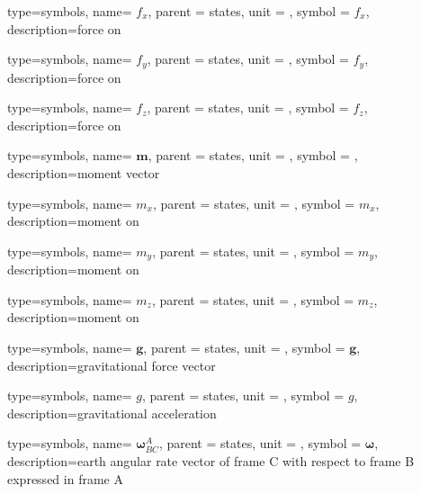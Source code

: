 {type=symbols,
  name= \ensuremath{f_{x}},
  parent = {states},
  unit = \unexpanded{\si{\newton}},
  symbol = \ensuremath{f_{x}},
  description={force on }
}

{type=symbols,
  name= \ensuremath{f_{y}},
  parent = {states},
  unit = \unexpanded{\si{\newton}},
  symbol = \ensuremath{f_{y}},
  description={force on }
}

{type=symbols,
  name= \ensuremath{f_{z}},
  parent = {states},
  unit = \unexpanded{\si{\newton}},
  symbol = \ensuremath{f_{z}},
  description={force on }
}


{type=symbols,
  name= \ensuremath{\mathbf{m}},
  parent = {states},
  unit = \unexpanded{},
  symbol = ,
  description={moment vector}
}

{type=symbols,
  name= \ensuremath{m_{x}},
  parent = {states},
  unit = \unexpanded{\si{\newton\meter}},
  symbol = \ensuremath{m_{x}},
  description={moment on }
}

{type=symbols,
  name= \ensuremath{m_{y}},
  parent = {states},
  unit = \unexpanded{\si{\newton\meter}},
  symbol = \ensuremath{m_{y}},
  description={moment on }
}

{type=symbols,
  name= \ensuremath{m_{z}},
  parent = {states},
  unit = \unexpanded{\si{\newton\meter}},
  symbol = \ensuremath{m_{z}},
  description={moment on }
}

{type=symbols,
  name= \ensuremath{\mathbf{g}},
  parent = {states},
  unit = \unexpanded{},
  symbol = \ensuremath{\mathbf{g}},
  description={gravitational force vector}
}

{type=symbols,
  name= \ensuremath{g},
  parent = {states},
  unit = \unexpanded{\si{\meter\per\second\squared}},
  symbol = \ensuremath{g},
  description={gravitational acceleration}
}

{type=symbols,
  name= \ensuremath{\boldsymbol{\omega}_{BC}^{A}},
  parent = {states},
  unit = \unexpanded{\si{\radian\per\second}},
  symbol = \ensuremath{\boldsymbol{\omega}},
  description={earth angular rate vector of frame C with respect to frame B expressed in frame A}
}

